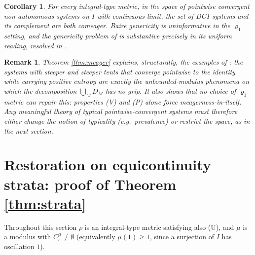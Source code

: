 \documentclass[11pt]{article}
\newtheorem{corollary}[theorem]{Corollary}
\newtheorem{remark}[theorem]{Remark}
\newcommand{\I}{I}
\begin{document}
\begin{corollary}\label{cor:trivial}
For every integral-type metric, in the space of pointwise convergent
non-autonomous systems on $\I$ with continuous limit, the set of DC1 systems and
its complement are both comeager.  Baire genericity is uninformative in the
$\varrho_1$ setting, and the genericity problem of \cite{BR} is substantive
precisely in its uniform reading, resolved in \cite{companion}.
\end{corollary}

\begin{remark}
Theorem \ref{thm:meager} explains, structurally, the examples of
\cite[Section 3]{BR}: the systems with steeper and steeper tents that converge
pointwise to the identity while carrying positive entropy are exactly the
unbounded-modulus phenomena on which the decomposition $\bigcup_MD_M$ has no
grip.  It also shows that no choice of $\varrho_1$-metric can repair this:
properties (V) and (P) alone force meagerness-in-itself.  Any meaningful theory of
typical pointwise-convergent systems must therefore either change the notion of
typicality (e.g.\ prevalence) or restrict the space, as in the next section.
\end{remark}

\section{Restoration on equicontinuity strata: proof of Theorem \ref{thm:strata}}
\label{sec:strata}

Throughout this section $\rho$ is an integral-type metric satisfying also (U),
and $\mu$ is a modulus with $C^\mu_s\ne\emptyset$ (equivalently $\mu(1)\ge1$,
since a surjection of $\I$ has oscillation $1$).
\end{document}
